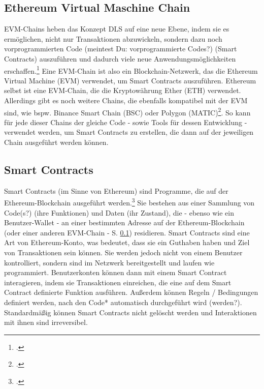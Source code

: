 \documentclass[12pt, a4paper]{article}
\begin{document}
{\subsection{Ethereum Virtual Maschine Chain}
\label{sec:definition-evm-chain}
EVM-Chains heben das Konzept DLS auf eine neue Ebene, indem sie es ermöglichen, nicht nur Transaktionen abzuwickeln, sondern dazu noch vorprogrammierten Code (meintest Du: vorprogrammierte Codes?)  (Smart Contracts) auszuführen und dadurch viele neue Anwendungsmöglichkeiten erschaffen.\footcite[Vgl. hierzu und zum Folgenden][]{w5}
Eine EVM-Chain ist also ein Blockchain-Netzwerk, das die Ethereum Virtual Machine (EVM) verwendet, um Smart Contracts auszuführen.
Ethereum selbst ist eine EVM-Chain, die die Kryptowährung Ether (ETH) verwendet. Allerdings gibt es noch weitere Chains, die ebenfalls kompatibel mit der EVM sind, wie bspw. Binance Smart Chain (BSC) oder Polygon (MATIC)\footcite[Vgl.][]{w6}.
So kann für jede dieser Chains der gleiche Code - sowie Tools für dessen Entwicklung - verwendet werden, um Smart Contracts zu erstellen, die dann auf der jeweiligen Chain ausgeführt werden können.
\subsection{Smart Contracts}
\label{sec:definition-smart-contracts}
Smart Contracts (im Sinne von Ethereum) sind Programme, die auf der Ethereum-Blockchain ausgeführt werden.\footcite[Vgl. hierzu und zum Folgenden][]{w4} 
Sie bestehen aus einer Sammlung von Code(s?) (ihre Funktionen) und Daten (ihr Zustand), die - ebenso wie ein Benutzer-Wallet - an einer bestimmten Adresse auf der Ethereum-Blockchain (oder einer anderen EVM-Chain - S. \ref{sec:definition-evm-chain}) residieren.
Smart Contracts sind eine Art von Ethereum-Konto, was bedeutet, dass sie ein Guthaben haben und Ziel von Transaktionen sein können. 
Sie werden jedoch nicht von einem Benutzer kontrolliert, sondern sind im Netzwerk bereitgestellt und laufen wie programmiert. 
Benutzerkonten können dann mit einem Smart Contract interagieren, indem sie Transaktionen einreichen, die eine auf dem Smart Contract definierte Funktion ausführen. 
Außerdem können Regeln / Bedingungen definiert werden, nach den Code* automatisch durchgeführt wird (werden?).
Standardmäßig können Smart Contracts nicht gelöscht werden und Interaktionen mit ihnen sind irreversibel.
}
\end{document}
